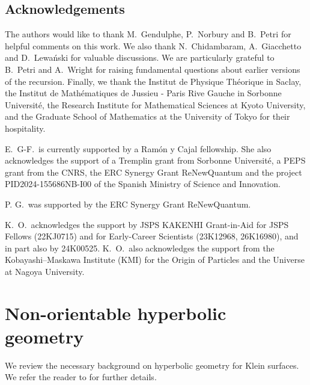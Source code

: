 \documentclass[12pt]{amsart}
\theoremstyle{plain}
\theoremstyle{definition}
\theoremstyle{remark}
\numberwithin{equation}{section}
\begin{document}


\subsection*{Acknowledgements}

The authors would like to thank M.~Gendulphe, P.~Norbury and B.~Petri for helpful comments on this work. We also thank N.~Chidambaram, A.~Giacchetto and D.~Lewa\'nski for valuable discussions. We are particularly grateful to B.~Petri and A.~Wright for raising fundamental questions about earlier versions of the recursion. Finally, we thank the Institut de Physique Th\'eorique in Saclay, the Institut de Math\'ematiques de Jussieu - Paris Rive Gauche in Sorbonne Universit\'e, the Research Institute for Mathematical Sciences at Kyoto University, and the Graduate School of Mathematics at the University of Tokyo for their hospitality.


E.~G-F.~is currently supported by a Ram\'on y Cajal fellowship. She also acknowledges the support of a Tremplin grant from Sorbonne Universit\'e, a PEPS grant from the CNRS, the ERC Synergy Grant ReNewQuantum and the project PID2024-155686NB-I00 of the Spanish Ministry of Science and Innovation.

P. G.~was supported by the ERC Synergy Grant ReNewQuantum.

K.~O.~acknowledges the support by JSPS KAKENHI Grant-in-Aid for JSPS Fellows (22KJ0715) and  for Early-Career Scientists (23K12968, 26K16980), and in part also by 24K00525. K.~O.~also acknowledges the support from the Kobayashi--Maskawa Institute (KMI) for the Origin of Particles and the Universe at Nagoya University.  



\newpage 

\section{Non-orientable hyperbolic geometry}\label{sec:non-orientable geometry}


We review the necessary background on hyperbolic geometry for Klein surfaces. We refer the reader to \cite{Jos97,Nor07,Bus10,PP13,Gen17} for further details.
\end{document}

